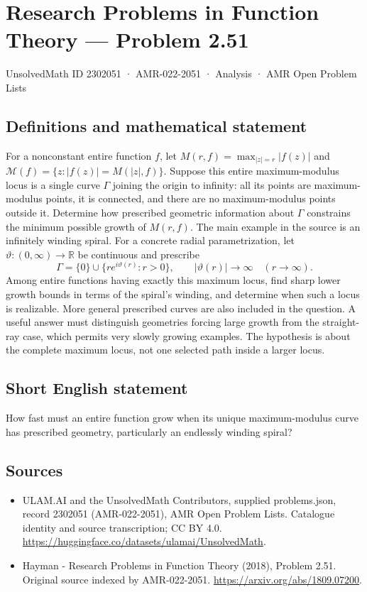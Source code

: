 \documentclass[11pt,a4paper]{article}
\begin{document}
\section*{Research Problems in Function Theory — Problem 2.51}\label{2302051}
{\small UnsolvedMath ID 2302051 · AMR-022-2051 · Analysis · AMR Open Problem Lists}
\subsection{Definitions and mathematical statement}
For a nonconstant entire function $f$, let
$M(r,f)=\max_{|z|=r}|f(z)|$ and
$\mathcal M(f)=\{z:|f(z)|=M(|z|,f)\}$.
Suppose this entire maximum-modulus locus is a single curve $\Gamma$ joining the origin to infinity: all its points are maximum-modulus points, it is connected, and there are no maximum-modulus points outside it.
Determine how prescribed geometric information about $\Gamma$ constrains the minimum possible growth of $M(r,f)$. The main example in the source is an infinitely winding spiral. For a concrete radial parametrization, let $\vartheta:(0,\infty)\to\mathbb R$ be continuous and prescribe
\[
\Gamma=\{0\}\cup\{re^{i\vartheta(r)}:r>0\},
\qquad |\vartheta(r)|\to\infty\quad(r\to\infty).
\]
Among entire functions having exactly this maximum locus, find sharp lower growth bounds in terms of the spiral's winding, and determine when such a locus is realizable. More general prescribed curves are also included in the question. A useful answer must distinguish geometries forcing large growth from the straight-ray case, which permits very slowly growing examples. The hypothesis is about the complete maximum locus, not one selected path inside a larger locus.
\subsection{Short English statement}
How fast must an entire function grow when its unique maximum-modulus curve has prescribed geometry, particularly an endlessly winding spiral?
\subsection{Sources}
\begin{itemize}
\item[S1] ULAM.AI and the UnsolvedMath Contributors, supplied problems.json, record 2302051 (AMR-022-2051), AMR Open Problem Lists. Catalogue identity and source transcription; CC BY 4.0.
\url{https://huggingface.co/datasets/ulamai/UnsolvedMath}.
\item[S2] Hayman - Research Problems in Function Theory (2018), Problem 2.51. Original source indexed by AMR-022-2051.
\url{https://arxiv.org/abs/1809.07200}.
\end{itemize}
\end{document}
